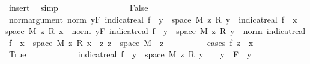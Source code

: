 \begin{isabellebody}
\ insert\ \isamarkupfalse%
\ simp\isanewline
\ \ \ \ \ \ \isamarkupfalse%
\isanewline
\ \ \ \ \ \ \ \ \isamarkupfalse%
\ False\isanewline
\ \ \ \ \ \ \ \ \isamarkupfalse%
\ norm{\isacharunderscore}{\kern0pt}argument{\isacharcolon}{\kern0pt}\ {\isachardoublequoteopen}norm\ {\isacharparenleft}{\kern0pt}{\isacharparenleft}{\kern0pt}{\isasymSum}y{\isasymin}F{\isachardot}{\kern0pt}\ indicat{\isacharunderscore}{\kern0pt}real\ {\isacharparenleft}{\kern0pt}f\ {\isacharminus}{\kern0pt}{\isacharbackquote}{\kern0pt}\ {\isacharbraceleft}{\kern0pt}y{\isacharbraceright}{\kern0pt}\ {\isasyminter}\ space\ M{\isacharparenright}{\kern0pt}\ z\ {\isacharasterisk}{\kern0pt}\isactrlsub R\ y{\isacharparenright}{\kern0pt}\ {\isacharplus}{\kern0pt}\ indicat{\isacharunderscore}{\kern0pt}real\ {\isacharparenleft}{\kern0pt}f\ {\isacharminus}{\kern0pt}{\isacharbackquote}{\kern0pt}\ {\isacharbraceleft}{\kern0pt}x{\isacharbraceright}{\kern0pt}\ {\isasyminter}\ space\ M{\isacharparenright}{\kern0pt}\ z\ {\isacharasterisk}{\kern0pt}\isactrlsub R\ x{\isacharparenright}{\kern0pt}\ {\isacharequal}{\kern0pt}\ norm\ {\isacharparenleft}{\kern0pt}{\isasymSum}y{\isasymin}F{\isachardot}{\kern0pt}\ indicat{\isacharunderscore}{\kern0pt}real\ {\isacharparenleft}{\kern0pt}f\ {\isacharminus}{\kern0pt}{\isacharbackquote}{\kern0pt}\ {\isacharbraceleft}{\kern0pt}y{\isacharbraceright}{\kern0pt}\ {\isasyminter}\ space\ M{\isacharparenright}{\kern0pt}\ z\ {\isacharasterisk}{\kern0pt}\isactrlsub R\ y{\isacharparenright}{\kern0pt}\ {\isacharplus}{\kern0pt}\ norm\ {\isacharparenleft}{\kern0pt}indicat{\isacharunderscore}{\kern0pt}real\ {\isacharparenleft}{\kern0pt}f\ {\isacharminus}{\kern0pt}{\isacharbackquote}{\kern0pt}\ {\isacharbraceleft}{\kern0pt}x{\isacharbraceright}{\kern0pt}\ {\isasyminter}\ space\ M{\isacharparenright}{\kern0pt}\ z\ {\isacharasterisk}{\kern0pt}\isactrlsub R\ x{\isacharparenright}{\kern0pt}{\isachardoublequoteclose}\ \ z{\isacharcolon}{\kern0pt}\ {\isachardoublequoteopen}z\ {\isasymin}\ space\ M{\isachardoublequoteclose}\ \ z\isanewline
\ \ \ \ \ \ \ \ \isamarkupfalse%
\ {\isacharparenleft}{\kern0pt}cases\ {\isachardoublequoteopen}f\ z\ {\isacharequal}{\kern0pt}\ x{\isachardoublequoteclose}{\isacharparenright}{\kern0pt}\isanewline
\ \ \ \ \ \ \ \ \ \ \isamarkupfalse%
\ True\isanewline
\ \ \ \ \ \ \ \ \ \ \isamarkupfalse%
\ {\isachardoublequoteopen}indicat{\isacharunderscore}{\kern0pt}real\ {\isacharparenleft}{\kern0pt}f\ {\isacharminus}{\kern0pt}{\isacharbackquote}{\kern0pt}\ {\isacharbraceleft}{\kern0pt}y{\isacharbraceright}{\kern0pt}\ {\isasyminter}\ space\ M{\isacharparenright}{\kern0pt}\ z\ {\isacharasterisk}{\kern0pt}\isactrlsub R\ y\ {\isacharequal}{\kern0pt}\ {}{\isachardoublequoteclose}\ \ {\isachardoublequoteopen}y\ {\isasymin}\ F{\isachardoublequoteclose}\ \ y\ \isamarkupfalse%

\end{isabellebody}
